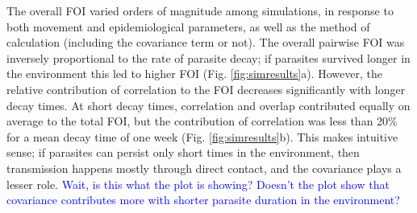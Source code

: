 \documentclass[letterpaper]{article}
\begin{document}
The overall FOI varied orders of magnitude among simulations, in response to both movement and epidemiological parameters, as well as the method of calculation (including the covariance term or not). 
The overall pairwise FOI was inversely proportional to the rate of parasite decay; if parasites survived  longer in the environment this led to higher FOI (Fig. \ref{fig:simresults}a). However, the relative contribution of correlation to the FOI decreases significantly with longer decay times. At short decay times, correlation and overlap contributed equally on average to the total FOI, but the contribution of correlation was less than 20\% for a mean decay time of one week (Fig. \ref{fig:simresults}b).  This makes intuitive sense; if parasites can persist only short times in the environment, then transmission happens mostly through direct contact, and the covariance plays a lesser role. \textcolor{blue}{Wait, is this what the plot is showing? Doesn't the plot show that covariance contributes more with shorter parasite duration in the environment?}
\end{document}
